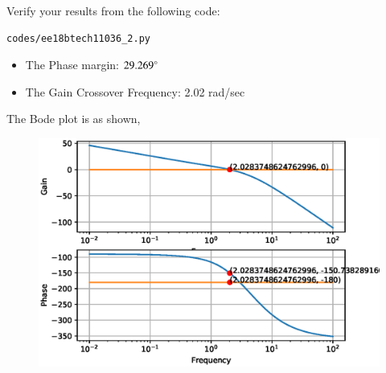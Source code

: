 \begin{figure}[!ht]
    \centering
	\resizebox{\columnwidth}{!}{}
\caption{}
\label{fig:ee18btech11036_fin}
\end{figure}


Verify your results from the following code:
\begin{lstlisting}
codes/ee18btech11036_2.py
\end{lstlisting}
\begin{itemize}
    \item The Phase margin: $29.269\degree$
    \item The Gain Crossover Frequency: 2.02 rad/sec
\end{itemize}
%
The Bode plot is as shown,
\begin{figure}[!ht]
  \centering
  \includegraphics[width=\columnwidth]{./figs/ee18btech11036_2.eps}
  \caption{}
  \label{fig:ee18btech11036_2}
\end{figure}


